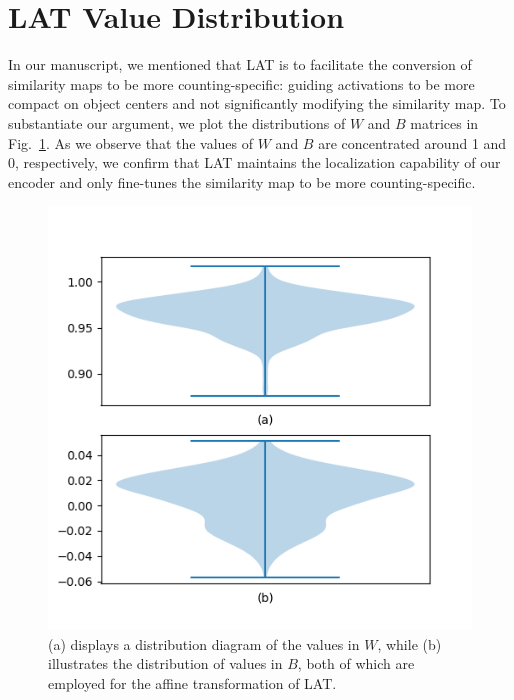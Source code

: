 \section{LAT Value Distribution}
In our manuscript, we mentioned that LAT is to facilitate the conversion of similarity maps to be more counting-specific: guiding activations to be more compact on object centers and not significantly modifying the similarity map.
To substantiate our argument, we plot the distributions of $W$ and $B$ matrices in Fig.~\ref{fig:LAT}.
As we observe that the values of $W$ and $B$ are concentrated around 1 and 0, respectively, we confirm that LAT maintains the localization capability of our encoder and only fine-tunes the similarity map to be more counting-specific.

\begin{figure}[ht]
    \begin{center}
    \includegraphics[width=\linewidth]{figs/LAT.png}

    \end{center}
    \caption{
        (a) displays a distribution diagram of the values in $W$, while (b) illustrates the distribution of values in $B$, both of which are employed for the affine transformation of LAT.
    }
    \label{fig:LAT}
\end{figure}

